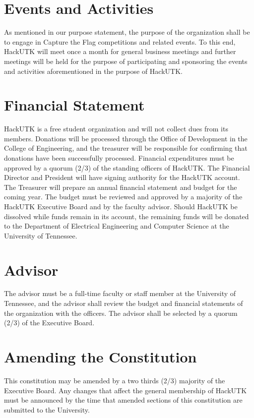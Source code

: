 \documentclass[12pt]{article}
\begin{document}
\section{Events and Activities}
As mentioned in our purpose statement, the purpose of the organization shall be to engage in Capture the Flag competitions and related events. To this end, HackUTK will meet once a month for general business meetings and further meetings will be held for the purpose of participating and sponsoring the events and activities aforementioned in the purpose of HackUTK.

\section*{Financial Statement}
HackUTK is a free student organization and will not collect dues from its members. Donations will be processed through the Office of Development in the College of Engineering, and the treasurer will be responsible for confirming that donations have been successfully processed. Financial expenditures must be approved by a quorum (2/3) of the standing officers of HackUTK. The Financial Director and President will have signing authority for the HackUTK account. The Treasurer will prepare an annual financial statement and budget for the coming year. The budget must be reviewed and approved by a majority of the HackUTK Executive Board and by the faculty advisor. Should HackUTK be dissolved while funds remain in its account, the remaining funds will be donated to the Department of Electrical Engineering and Computer Science at the University of Tennessee.

\section{Advisor}
The advisor must be a full-time faculty or staff member at the University of Tennessee, and the advisor shall review the budget and financial statements of the organization with the officers. The advisor shall be selected by a quorum (2/3) of the Executive Board.

\section{Amending the Constitution}
This constitution may be amended by a two thirds (2/3) majority of the Executive
Board. Any changes that affect the general membership of HackUTK must be
announced by the time that amended sections of this constitution are submitted to the University.
\end{document}

